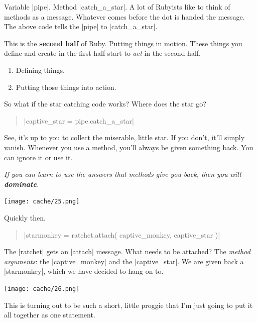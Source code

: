 \documentclass[12pt,twoside]{report}
\begin{document}
Variable \rubyinline|pipe|.  Method
\rubyinline|catch_a_star|.  A lot of Rubyists like to
think of methods as a message. Whatever comes before the dot is handed
the message.  The above code tells the
\rubyinline|pipe| to
\rubyinline|catch_a_star|.

This is the {\bf second half} of Ruby.  Putting things in motion.
These things you define and create in the first half start to {\em
  act} in the second half.

\begin{enumerate}
\item Defining things.
\item Putting those things into action.
\end{enumerate}

So what if the star catching code works?  Where does the star go?

\begin{quote}
\rubyinline|captive_star = pipe.catch_a_star|\end{quote}


See, it's up to you to collect the miserable, little star.  If you
don't, it'll simply vanish. Whenever you use a method, you'll always
be given something back.  You can ignore it or use it.

\bigskip

\pagebreak

{\em If you can learn to use the answers that methods give you back,
  then you will {\bf dominate}.}

\begin{center}
	\texttt{[image: cache/25.png]}
\end{center}


Quickly then.

\begin{quote}
\rubyinline|starmonkey = ratchet.attach( captive_monkey, captive_star )|\end{quote}


The \rubyinline|ratchet| gets an
\rubyinline|attach| message.  What needs to be
attached?  The {\em method arguments}: the
\rubyinline|captive_monkey| and the
\rubyinline|captive_star|.  We are given back a
\rubyinline|starmonkey|, which we have decided to hang
on to.

\begin{center}
	\texttt{[image: cache/26.png]}
\end{center}

This is turning out to be such a short, little proggie that I'm just
going to put it all together as one statement.
\end{document}

